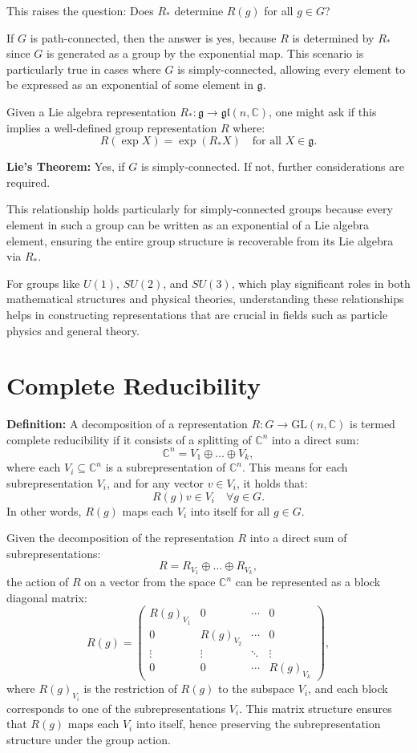 \documentclass{article}
\begin{document}
This raises the question: Does \( R_* \) determine \( R(g) \) for all \( g \in G \)?

If \( G \) is path-connected, then the answer is yes, because \( R \) is determined by \( R_* \) since \( G \) is generated as a group by the exponential map. This scenario is particularly true in cases where \( G \) is simply-connected, allowing every element to be expressed as an exponential of some element in \( \mathfrak{g} \).

Given a Lie algebra representation \( R_*: \mathfrak{g} \to \mathfrak{gl}(n, \mathbb{C}) \), one might ask if this implies a well-defined group representation \( R \) where:
\[
R(\exp X) = \exp(R_* X) \quad \text{for all } X \in \mathfrak{g}.
\]

\textbf{Lie's Theorem:} Yes, if \( G \) is simply-connected. If not, further considerations are required.

This relationship holds particularly for simply-connected groups because every element in such a group can be written as an exponential of a Lie algebra element, ensuring the entire group structure is recoverable from its Lie algebra via \( R_* \).

For groups like \( U(1) \), \( SU(2) \), and \( SU(3) \), which play significant roles in both mathematical structures and physical theories, understanding these relationships helps in constructing representations that are crucial in fields such as particle physics and general theory.

\section{Complete Reducibility}

\textbf{Definition:} A decomposition of a representation \( R: G \to \mathrm{GL}(n, \mathbb{C}) \) is termed complete reducibility if it consists of a splitting of \( \mathbb{C}^n \) into a direct sum:
\[
\mathbb{C}^n = V_1 \oplus \dots \oplus V_k,
\]
where each \( V_i \subseteq \mathbb{C}^n \) is a subrepresentation of \( \mathbb{C}^n \). This means for each subrepresentation \( V_i \), and for any vector \( v \in V_i \), it holds that:
\[
R(g) v \in V_i \quad \forall g \in G.
\]
In other words, \( R(g) \) maps each \( V_i \) into itself for all \( g \in G \).

Given the decomposition of the representation \( R \) into a direct sum of subrepresentations:
\[
R = R_{V_1} \oplus \dots \oplus R_{V_k},
\]
the action of \( R \) on a vector from the space \( \mathbb{C}^n \) can be represented as a block diagonal matrix:
\[
R(g) = \begin{pmatrix}
R(g)_{V_1} & 0 & \cdots & 0 \\
0 & R(g)_{V_2} & \cdots & 0 \\
\vdots & \vdots & \ddots & \vdots \\
0 & 0 & \cdots & R(g)_{V_k}
\end{pmatrix},
\]
where \( R(g)_{V_i} \) is the restriction of \( R(g) \) to the subspace \( V_i \), and each block corresponds to one of the subrepresentations \( V_i \). This matrix structure ensures that \( R(g) \) maps each \( V_i \) into itself, hence preserving the subrepresentation structure under the group action.
\end{document}
